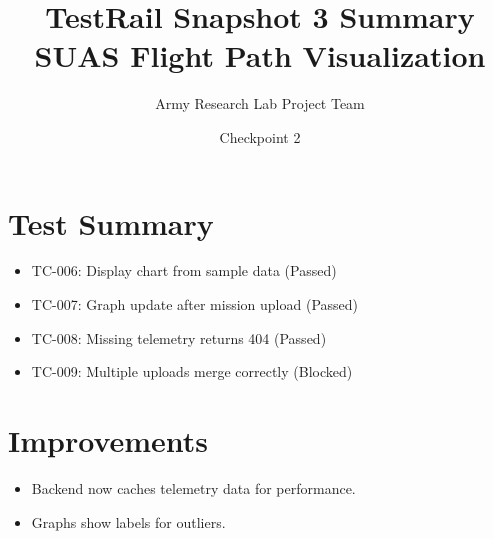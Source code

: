 \documentclass[12pt]{article}
\title{TestRail Snapshot 3 Summary\\SUAS Flight Path Visualization}
\author{Army Research Lab Project Team}
\date{Checkpoint 2}
\begin{document}
\maketitle

\section{Test Summary}
\begin{itemize}
  \item TC-006: Display chart from sample data (Passed)
  \item TC-007: Graph update after mission upload (Passed)
  \item TC-008: Missing telemetry returns 404 (Passed)
  \item TC-009: Multiple uploads merge correctly (Blocked)
\end{itemize}

\section{Improvements}
\begin{itemize}
  \item Backend now caches telemetry data for performance.
  \item Graphs show labels for outliers.
\end{itemize}
\end{document}
